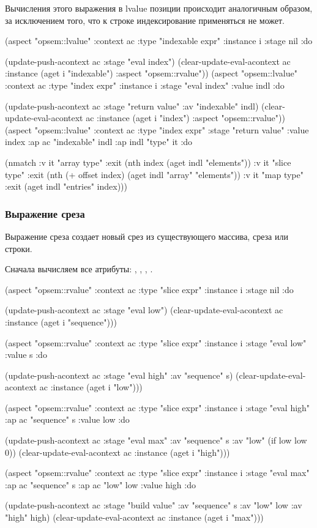 \documentclass[12pt,twoside,russian]{article}
\newcommand{\textABMLString}[1]{{\color{abmlString}#1}}
\newcommand{\ABMLString}[1]{\abmlinline{\textABMLString{#1}}}
\begin{document}
Вычисления этого выражения в lvalue позиции происходит аналогичным образом, за исключением того, что к строке индексирование применяться не может.

\begin{ABMLCode}
(aspect "opsem::lvalue" :context ac :type "indexable expr" :instance i 
  :stage nil :do 
  
  (update-push-acontext ac :stage "eval index")
  (clear-update-eval-acontext ac :instance (aget i "indexable") 
    :aspect "opsem::rvalue"))
(aspect "opsem::lvalue" :context ac :type "index expr" :instance i 
  :stage "eval index" :value indl :do 
  
  (update-push-acontext ac :stage "return value" :av "indexable" indl)
  (clear-update-eval-acontext ac :instance (aget i "index") 
    :aspect "opsem::rvalue"))
(aspect "opsem::lvalue" :context ac :type "index expr" 
  :stage "return value" :value index :ap ac "indexable" indl 
  :ap indl "type" it :do 
  
  (nmatch 
  :v it "array type" :exit (nth index (aget indl "elements")) 
  :v it "slice type" 
  :exit (nth (+ offset index) (aget indl "array" "elements"))
  :v it "map type"   :exit (aget indl "entries" index)))
\end{ABMLCode}


\subsubsection{Выражение среза}
Выражение среза создает новый срез из существующего массива, среза или строки.

Сначала вычисляем все атрибуты: \ABMLString{sequence}, \ABMLString{low}, \ABMLString{high}, \ABMLString{max}.

\begin{ABMLCode}
(aspect "opsem::rvalue" :context ac :type "slice expr" :instance i 
  :stage nil :do 
  
  (update-push-acontext ac :stage "eval low")
  (clear-update-eval-acontext ac :instance (aget i "sequence")))

(aspect "opsem::rvalue" :context ac :type "slice expr" :instance i 
  :stage "eval low" :value s :do 
  
  (update-push-acontext ac :stage "eval high" :av "sequence" s)
  (clear-update-eval-acontext ac :instance (aget i "low")))

(aspect "opsem::rvalue" :context ac :type "slice expr" :instance i 
  :stage "eval high" :ap ac "sequence" s :value low :do
  
  (update-push-acontext ac :stage "eval max" :av "sequence" s 
                           :av "low" (if low low 0))
  (clear-update-eval-acontext ac :instance (aget i "high")))

(aspect "opsem::rvalue" :context ac :type "slice expr" :instance i 
  :stage "eval max" :ap ac "sequence" s :ap ac "low" low :value high :do 
  
  (update-push-acontext ac :stage "build value" :av "sequence" s 
                           :av "low" low :av "high" high)
  (clear-update-eval-acontext ac :instance (aget i "max")))
\end{ABMLCode}
\end{document}
